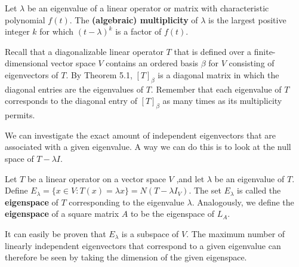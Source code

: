 \begin{definition}
    Let \( \lambda  \) be an eigenvalue of a linear operator or matrix with characteristic polynomial \( f(t) \). The \textbf{(algebraic) multiplicity} of \( \lambda  \) is the largest positive integer \( k  \) for which \( (t- \lambda)^{k }  \) is a factor of \( f(t) \).
\end{definition}

Recall that a diagonalizable linear operator \( T  \) that is defined over a finite-dimensional vector space \( V  \) contains an ordered basis \( \beta \) for \( V \) consisting of eigenvectors of \( T  \). By Theorem 5.1, \( [T]_{\beta} \) is a diagonal matrix in which the diagonal entries are the eigenvalues of \( T  \). Remember that each eigenvalue of \( T  \) corresponds to the diagonal entry of \( [T]_{\beta} \) as many times as its multiplicity permits. 

We can investigate the exact amount of independent eigenvectors that are associated with a given eigenvalue. A way we can do this is to look at the null space of \( T - \lambda I  \).

\begin{definition}[Eigenspace]
    Let \( T  \) be a linear operator on a vector space \( V  \) ,and let \( \lambda  \) be an eigenvalue of \( T  \). Define \( {E}_{\lambda} = \{ x \in V : T(x) = \lambda x \}  =  N(T - \lambda {I}_{V}) \). The set \( {E}_{\lambda} \) is called the \textbf{eigenspace} of \( T  \) corresponding to the eigenvalue \( \lambda  \). Analogously, we define the \textbf{eigenspace} of a square matrix \( A  \) to be the eigenspace of \( {L}_{A} \).
\end{definition}

It can easily be proven that \( {E}_{\lambda} \) is a subspace of \( V  \). The maximum number of linearly independent eigenvectors that correspond to a given eigenvalue can therefore be seen by taking the dimension of the given eigenspace.

